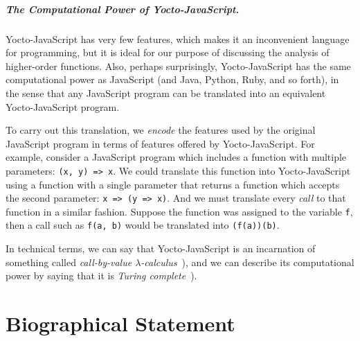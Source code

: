 \documentclass[12pt, oneside]{book}
\begin{document}
\paragraph{The Computational Power of Yocto-JavaScript.}

Yocto-JavaScript has very few features, which makes it an inconvenient language for programming, but it is ideal for our purpose of discussing the analysis of higher-order functions. Also, perhaps surprisingly, Yocto-JavaScript has the same computational power as JavaScript (and Java, Python, Ruby, and so forth), in the sense that any JavaScript program can be translated into an equivalent Yocto-JavaScript program.

To carry out this translation, we \emph{encode} the features used by the original JavaScript program in terms of features offered by Yocto-JavaScript. For example, consider a JavaScript program which includes a function with multiple parameters: \texttt{(x, y) => x}. We could translate this function into Yocto-JavaScript using a function with a single parameter that returns a function which accepts the second parameter: \texttt{x => (y => x)}. And we must translate every \emph{call} to that function in a similar fashion. Suppose the function was assigned to the variable \texttt{f}, then a call such as \texttt{f(a, b)} would be translated into \texttt{(f(a))(b)}.

In technical terms, we can say that Yocto-JavaScript is an incarnation of something called \emph{call-by-value \(\lambda\)-calculus}~\cite[§~6]{understanding-computation}), and we can describe its computational power by saying that it is \emph{Turing complete}~\cite[§~7]{understanding-computation}).


\appendix


\backmatter




\chapter{Biographical Statement}

\end{document}
